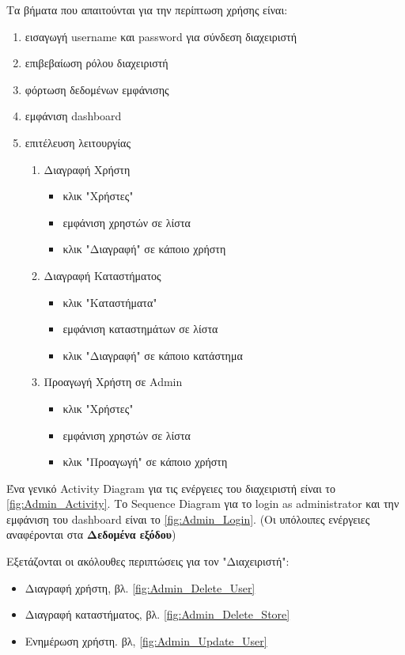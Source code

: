 Τα βήματα που απαιτούνται για την περίπτωση χρήσης είναι:
\begin{enumerate}
	\item εισαγωγή username και password για σύνδεση διαχειριστή
	\item επιβεβαίωση ρόλου διαχειριστή
	\item φόρτωση δεδομένων εμφάνισης
	\item εμφάνιση dashboard
	\item επιτέλευση λειτουργίας
	\begin{enumerate}
		\item Διαγραφή Χρήστη
		\begin{itemize}
			\item κλικ "Χρήστες"
			\item εμφάνιση χρηστών σε λίστα
			\item κλικ "Διαγραφή" σε κάποιο χρήστη
		\end{itemize}
		\item Διαγραφή Καταστήματος
		\begin{itemize}
			\item κλικ "Καταστήματα"
			\item εμφάνιση καταστημάτων σε λίστα
			\item κλικ "Διαγραφή" σε κάποιο κατάστημα
		\end{itemize}
		\item Προαγωγή Χρήστη σε Admin
		\begin{itemize}
			\item κλικ "Χρήστες"
			\item εμφάνιση χρηστών σε λίστα
			\item κλικ "Προαγωγή" σε κάποιο χρήστη
		\end{itemize}
	\end{enumerate}
\end{enumerate}
Ένα γενικό Activity Diagram για τις ενέργειες του διαχειριστή είναι το \ref{fig:Admin_Activity}.
Το Sequence Diagram για το login as administrator και την εμφάνιση του dashboard είναι το \ref{fig:Admin_Login}.
(Οι υπόλοιπες ενέργειες αναφέρονται στα \textbf{Δεδομένα εξόδου})

Εξετάζονται οι ακόλουθες περιπτώσεις για τον "Διαχειριστή":
\begin{itemize}
	\item Διαγραφή χρήστη, βλ. \ref{fig:Admin_Delete_User}
	\item Διαγραφή καταστήματος, βλ. \ref{fig:Admin_Delete_Store}
	\item Ενημέρωση χρήστη. βλ, \ref{fig:Admin_Update_User}
\end{itemize}


